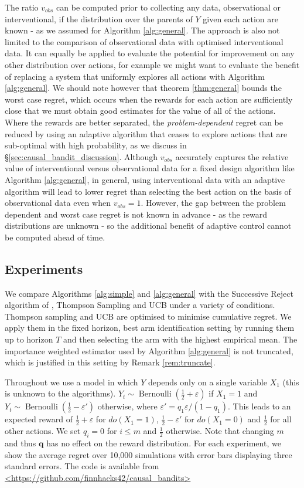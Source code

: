 \documentclass[11pt,a4paper,twoside]{report}
\newcommand{\bernoulli}{\operatorname{Bernoulli}}
\theoremstyle{plain}
\theoremstyle{definition}
\let\epsilon\varepsilon
\begin{document}
The ratio $v_{obs}$ can be computed prior to collecting any data, observational or interventional, if the distribution over the parents of $Y$ given each action are known - as we assumed for Algorithm \ref{alg:general}. The approach is also not limited to the comparison of observational data with optimised interventional data. It can equally be applied to evaluate the potential for improvement on any other distribution over actions, for example we might want to evaluate the benefit of replacing a system that uniformly explores all actions with Algorithm \ref{alg:general}. We should note however that theorem \ref{thm:general} bounds the worst case regret, which occurs when the rewards for each action are sufficiently close that we must obtain good estimates for the value of all of the actions. Where the rewards are better separated, the \emph{problem-dependent} regret can be reduced by using an adaptive algorithm that ceases to explore actions that are sub-optimal with high probability, as we discuss in \S\ref{sec:causal_bandit_discussion}. Although $v_{obs}$ accurately captures the relative value of interventional versus observational data for a fixed design algorithm like Algorithm \ref{alg:general}, in general, using interventional data with an adaptive algorithm will lead to lower regret than selecting the best action on the basis of observational data even when $v_{obs} = 1$. However, the gap between the problem dependent and worst case regret is not known in advance - as the reward distributions are unknown - so the additional benefit of adaptive control cannot be computed ahead of time.

\subsection{Experiments}
\label{sec:causal-bandit-experiments}
We compare Algorithms \ref{alg:simple} and \ref{alg:general} with the Successive Reject algorithm of \citet{Audibert2010}, Thompson Sampling and UCB under a variety of conditions. Thompson sampling and UCB are optimised to minimise cumulative regret. We apply them in the fixed horizon, best arm identification setting by running them up to horizon $T$ and then selecting the arm with the highest empirical mean. The importance weighted estimator used by Algorithm \ref{alg:general} is not truncated, which is justified in this setting by Remark \ref{rem:truncate}. 

Throughout we use a model in which $Y$ depends only on a single variable $X_1$ (this is unknown to the algorithms). $Y_t \sim \bernoulli(\frac{1}{2}+\epsilon)$ if $X_1=1$ and $Y_t \sim \bernoulli(\frac{1}{2}-\epsilon')$ otherwise, where $\epsilon' = q_1\epsilon/(1-q_1)$. This leads to an expected reward of $\frac{1}{2}+\epsilon$ for $do(X_1=1)$, $\frac{1}{2}-\epsilon'$ for $do(X_1=0)$ and $\frac{1}{2}$ for all other actions. We set $q_i = 0$ for $i \leq m$ and $\frac{1}{2}$ otherwise. Note that changing $m$ and thus $\boldsymbol{q}$ has no effect on the reward distribution. For each experiment, we show the average regret over 10,000 simulations with error bars displaying three standard errors. The code is available from \url{<https://github.com/finnhacks42/causal_bandits>} 
\end{document}
